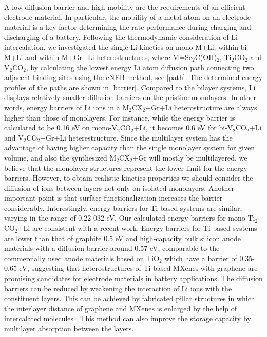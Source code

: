 A low diffusion barrier and high mobility are the requirements of an efficient electrode material. In particular, the mobility of a metal atom on an electrode material is a key factor determining the rate performance during charging and discharging of a battery. Following the thermodynamic consideration of Li intercalation, we investigated the single Li kinetics on mono-M+Li, within bi-M+Li and within M+Gr+Li heterostructures, where M=Sc$_2$C(OH)$_2$, Ti$_2$CO$_2$ and V$_2$CO$_2$, by calculating the lowest energy Li atom diffusion path connecting two adjacent binding sites using the cNEB method, see \autoref{path}. The determined energy profiles of the paths are shown in \autoref{barrier}. Compared to the bilayer systems, Li displays relatively smaller diffusion barriers on the pristine monolayers. In other words, energy barriers of Li ions in a M$_2$CX$_2$+Gr+Li heterostructure are always higher than those of monolayers. For instance, while the energy barrier is calculated to be 0.16 eV on mono-V$_2$CO$_2$+Li, it becomes 0.6 eV for bi-V$_2$CO$_2$+Li and V$_2$CO$_2$+Gr+Li heterestructure. Since the multilayer system has the advantage of having higher capacity than the single monolayer system for given volume, and also the synthesized M$_2$CX$_2$+Gr will mostly be multilayered, we believe that the monolayer structures represent the lower limit for the energy barriers. However, to obtain realistic kinetics properties we should consider the diffusion of ions between layers not only on isolated monolayers. Another important point is that surface functionalization increases the barrier considerably\cite{doi:10.1021/jp504493a}. Interestingly, energy barriers for Ti based systems are similar, varying in the range of 0.22-032 eV.  Our calculated energy barriers for mono-Ti$_2$CO$_2$+Li are consistent with a recent work\cite{doi:10.1021/jp504493a}. Energy barriers for Ti-based systems are lower than that of graphite 0.5 eV\cite{Thinius2014} and high-capacity bulk silicon anode materials with a diffusion barrier around 0.57 eV, comparable to the commercially used anode materials based on TiO$_2$ which have a barrier of 0.35-0.65 eV\cite{tio2-barrier,tio2-barrier-4,tio2-barrier-3}, suggesting that heterostructures of Ti-based MXenes with graphene are promising candidates for electrode materials in battery applications. The diffusion barriers can be reduced by weakening the interaction of Li ions with the constituent layers. This can be achieved by fabricated pillar structures in which the interlayer distance of graphene and MXenes is enlarged by the help of intercalated molecules \cite{Luo2017}. This method can also improve the storage capacity by multilayer absorption between the layers. 



